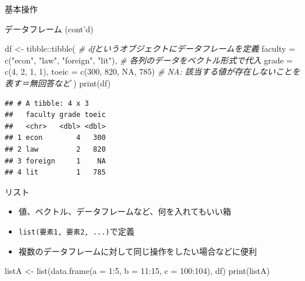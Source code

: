 \documentclass[
  ignorenonframetext,
]{beamer}
\newenvironment{Shaded}{\begin{snugshade}}{\end{snugshade}}
\newcommand{\AttributeTok}[1]{\textcolor[rgb]{0.77,0.63,0.00}{#1}}
\newcommand{\CommentTok}[1]{\textcolor[rgb]{0.56,0.35,0.01}{\textit{#1}}}
\newcommand{\ConstantTok}[1]{\textcolor[rgb]{0.00,0.00,0.00}{#1}}
\newcommand{\DecValTok}[1]{\textcolor[rgb]{0.00,0.00,0.81}{#1}}
\newcommand{\FunctionTok}[1]{\textcolor[rgb]{0.00,0.00,0.00}{#1}}
\newcommand{\NormalTok}[1]{#1}
\newcommand{\OtherTok}[1]{\textcolor[rgb]{0.56,0.35,0.01}{#1}}
\newcommand{\SpecialCharTok}[1]{\textcolor[rgb]{0.00,0.00,0.00}{#1}}
\newcommand{\StringTok}[1]{\textcolor[rgb]{0.31,0.60,0.02}{#1}}
\providecommand{\tightlist}{%
  \setlength{\itemsep}{0pt}\setlength{\parskip}{0pt}}
\begin{document}
\begin{frame}[fragile]{基本操作}
\begin{block}{データフレーム (cont'd)}
\begin{Shaded}
\begin{Highlighting}[]
\NormalTok{df }\OtherTok{\textless{}{-}}\NormalTok{ tibble}\SpecialCharTok{::}\FunctionTok{tibble}\NormalTok{( }\CommentTok{\# dfというオブジェクトにデータフレームを定義}
  \AttributeTok{faculty =} \FunctionTok{c}\NormalTok{(}\StringTok{"econ"}\NormalTok{, }\StringTok{"law"}\NormalTok{, }\StringTok{"foreign"}\NormalTok{, }\StringTok{"lit"}\NormalTok{), }\CommentTok{\# 各列のデータをベクトル形式で代入}
  \AttributeTok{grade =} \FunctionTok{c}\NormalTok{(}\DecValTok{4}\NormalTok{, }\DecValTok{2}\NormalTok{, }\DecValTok{1}\NormalTok{, }\DecValTok{1}\NormalTok{),}
  \AttributeTok{toeic =} \FunctionTok{c}\NormalTok{(}\DecValTok{300}\NormalTok{, }\DecValTok{820}\NormalTok{, }\ConstantTok{NA}\NormalTok{, }\DecValTok{785}\NormalTok{) }\CommentTok{\# NA: 該当する値が存在しないことを表す＝無回答など}
\NormalTok{)}
\FunctionTok{print}\NormalTok{(df)}
\end{Highlighting}
\end{Shaded}

\begin{verbatim}
## # A tibble: 4 x 3
##   faculty grade toeic
##   <chr>   <dbl> <dbl>
## 1 econ        4   300
## 2 law         2   820
## 3 foreign     1    NA
## 4 lit         1   785
\end{verbatim}
\end{block}

\begin{block}{リスト}
\protect\hypertarget{ux30eaux30b9ux30c8}{}
\begin{itemize}
\tightlist
\item
  値、ベクトル、データフレームなど、何を入れてもいい箱
\item
  \texttt{list(要素1,\ 要素2,\ ...)}で定義
\item
  複数のデータフレームに対して同じ操作をしたい場合などに便利
\end{itemize}

\begin{Shaded}
\begin{Highlighting}[]
\NormalTok{listA }\OtherTok{\textless{}{-}} \FunctionTok{list}\NormalTok{(}\FunctionTok{data.frame}\NormalTok{(}\AttributeTok{a =} \DecValTok{1}\SpecialCharTok{:}\DecValTok{5}\NormalTok{, }\AttributeTok{b =} \DecValTok{11}\SpecialCharTok{:}\DecValTok{15}\NormalTok{, }\AttributeTok{c =} \DecValTok{100}\SpecialCharTok{:}\DecValTok{104}\NormalTok{), df)}
\FunctionTok{print}\NormalTok{(listA)}
\end{Highlighting}
\end{Shaded}


\end{block}
\end{frame}
\end{document}
